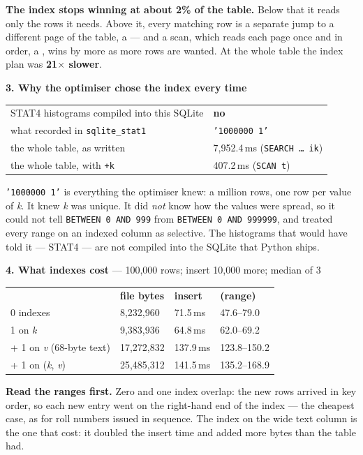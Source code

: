 \begin{measured}
\smallskip
\textbf{The index stops winning at about 2\% of the table.} Below that it reads
only the rows it needs. Above it, every matching row is a separate jump to a
different page of the table, a  --- and a scan, which
reads each page once and in order, a , wins by more
as more rows are wanted. At the whole table the index plan
was \textbf{21$\times$ slower}.

\medskip
\textbf{3. Why the optimiser chose the index every time}

\begin{tabular}{@{}L{7.8cm}L{6.0cm}@{}}
STAT4 histograms compiled into this SQLite & \textbf{no} \\
what  recorded in \texttt{sqlite\_stat1} & \texttt{'1000000 1'} \\
the whole table, as written & 7{,}952.4\,ms (\texttt{SEARCH \dots\ ik}) \\
the whole table, with \texttt{+k} & 407.2\,ms (\texttt{SCAN t}) \\
\end{tabular}

\smallskip
\texttt{'1000000 1'} is everything the optimiser knew: a million rows, one row
per value of \textit{k}. It knew \textit{k} was unique. It did \emph{not} know
how the values were spread, so it could not tell \texttt{BETWEEN 0 AND 999}
from \texttt{BETWEEN 0 AND 999999}, and treated every range on an indexed
column as selective. The histograms that would have told it --- STAT4 --- are
not compiled into the SQLite that Python ships.

\medskip
\textbf{4. What indexes cost} --- 100{,}000 rows; insert 10{,}000 more; median
of 3

\begin{tabular}{@{}L{3.2cm}R{3.0cm}R{3.0cm}R{3.2cm}@{}}
& \textbf{file bytes} & \textbf{insert} & \textbf{(range)} \\
0 indexes & 8{,}232{,}960  & 71.5\,ms  & 47.6--79.0 \\
1 on \textit{k} & 9{,}383{,}936 & 64.8\,ms & 62.0--69.2 \\
+ 1 on \textit{v} (68-byte text) & 17{,}272{,}832 & 137.9\,ms & 123.8--150.2 \\
+ 1 on (\textit{k}, \textit{v}) & 25{,}485{,}312 & 141.5\,ms & 135.2--168.9 \\
\end{tabular}

\smallskip
\textbf{Read the ranges first.} Zero and one index overlap: the new rows arrived
in key order, so each new entry went on the right-hand end of the index --- the
cheapest case, as for roll numbers issued in sequence. The index on the wide
text column is the one that cost: it doubled the insert time and added more
bytes than the table had.
\end{measured}

